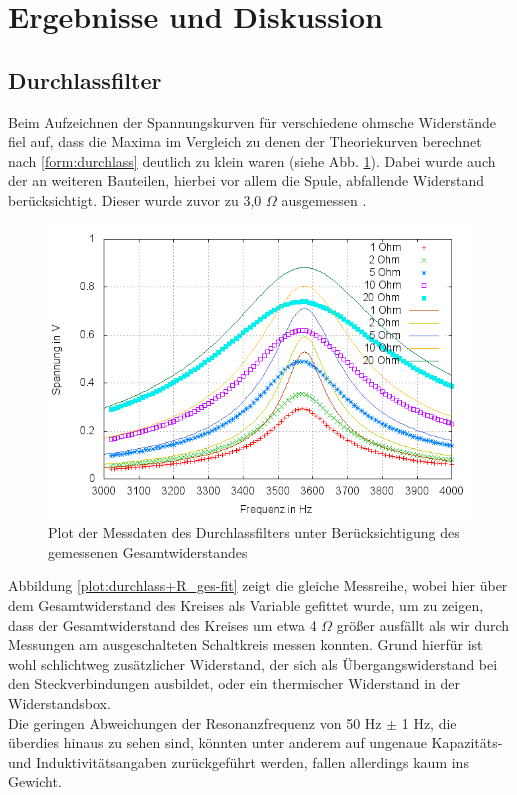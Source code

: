 \section{Ergebnisse und Diskussion}

\subsection{Durchlassfilter}
Beim Aufzeichnen der Spannungskurven für verschiedene ohmsche Widerstände fiel auf, dass die Maxima im Vergleich zu denen der Theoriekurven berechnet nach \eqref{form:durchlass} deutlich zu klein waren (siehe Abb. \ref{plot:durchlass+R_ges}). Dabei wurde auch der an weiteren Bauteilen, hierbei vor allem die Spule, abfallende Widerstand berücksichtigt. Dieser wurde zuvor zu 3,0 $  \Omega $ ausgemessen .
\begin{figure}[h]
        \includegraphics[width=.9\textwidth]{images/plot/durchlassfilter+theorie+R_ges.png}
\caption{Plot der Messdaten des Durchlassfilters unter Berücksichtigung des gemessenen Gesamtwiderstandes}
\label{plot:durchlass+R_ges}
\end{figure}
Abbildung \ref{plot:durchlass+R_ges-fit} zeigt die gleiche Messreihe, wobei hier über dem Gesamtwiderstand des Kreises als Variable gefittet wurde, um zu zeigen, dass der Gesamtwiderstand des Kreises um etwa 4 $\Omega$ größer ausfällt als wir durch Messungen am ausgeschalteten Schaltkreis messen konnten. Grund hierfür ist wohl schlichtweg zusätzlicher Widerstand, der sich als Übergangswiderstand bei den Steckverbindungen ausbildet, oder ein thermischer Widerstand in der Widerstandsbox.\\
Die geringen Abweichungen der Resonanzfrequenz von 50 Hz $\pm$ 1 Hz, die überdies hinaus zu sehen sind, könnten unter anderem auf ungenaue Kapazitäts- und Induktivitätsangaben zurückgeführt werden, fallen allerdings kaum ins Gewicht.

